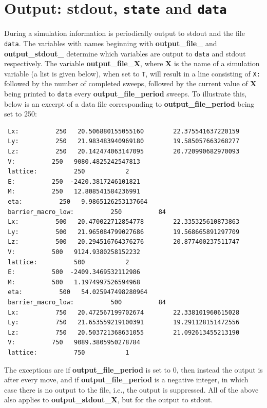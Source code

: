 \documentclass{report}
\begin{document}
\section{Output: stdout, \texttt{state} and \texttt{data}}\label{sec:output}
During a simulation information is periodically output to stdout and the file \texttt{data}. The variables with names beginning with 
\textbf{output\_file\_} and \textbf{output\_stdout\_} determine which variables are output to \texttt{data} and stdout respectively.
The variable \textbf{output\_file\_X}, where \textbf{X} is the name of a simulation variable (a list is given below), when set to \texttt{T}, 
will result in a line consisting of \texttt{X: } followed by the number of completed sweeps, followed by the current value of \textbf{X} 
being printed to \texttt{data} every \textbf{output\_file\_period} sweeps. To illustrate this, below is an excerpt of a data file corresponding
to \textbf{output\_file\_period} being set to 250:
\begin{verbatim}
 Lx:          250   20.506880155055160        22.375541637220159     
 Ly:          250   21.983483940969180        19.585057663268277     
 Lz:          250   20.142474063147095        20.720990682970093     
 V:          250   9080.4825242547813     
 lattice:          250           2
 E:          250  -2420.3817246101821     
 M:          250   12.808541584236991     
 eta:          250   9.9865126253137664     
 barrier_macro_low:          250          84
 Lx:          500   20.470022712854778        22.335325610873863     
 Ly:          500   21.965084799027686        19.568665891297709     
 Lz:          500   20.294516764376276        20.877400237511747     
 V:          500   9124.9380258152232     
 lattice:          500           2
 E:          500  -2409.3469532112986     
 M:          500   1.1974997526594968     
 eta:          500   54.025947498280964     
 barrier_macro_low:          500          84
 Lx:          750   20.472567199702674        22.338101960615028     
 Ly:          750   21.653559219100391        19.291128151472556     
 Lz:          750   20.503721368631055        21.092613455213190     
 V:          750   9089.3805950278784     
 lattice:          750           1
\end{verbatim}
The exceptions are if \textbf{output\_file\_period} is set to 0, then instead the output is after every move, and if \textbf{output\_file\_period} is a 
negative integer, in which case there is no output to the file, i.e., the output is suppressed. All of the above also applies to 
\textbf{output\_stdout\_X}, but for the output to stdout.
\end{document}

